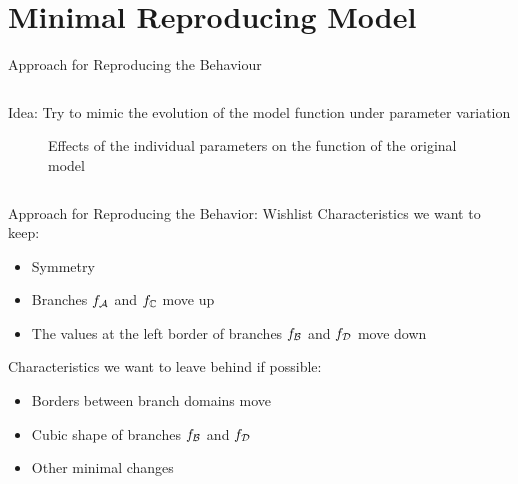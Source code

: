 
\section{Minimal Reproducing Model}

\begin{frame}{Approach for Reproducing the Behaviour}
    \vspace{-1em}
    \begin{columns}
        \begin{column}{1 \textwidth}
            Idea:
            Try to mimic the evolution of the model function under parameter variation

            \vspace{-2.0em}
            \begin{figure}
                \centering
                \caption*{Effects of the individual parameters on the function of the original model}
            \end{figure}
        \end{column}
    \end{columns}
\end{frame}

\begin{frame}{Approach for Reproducing the Behavior: Wishlist}
    Characteristics we want to keep:
    \begin{itemize}
        \item Symmetry
        \item Branches $f_{\mathcal{A}}$ and $f_{\mathbb{C}}$ move up
        \item The values at the left border of branches $f_{\mathcal{B}}$ and $f_{\mathcal{D}}$ move down
    \end{itemize}

    \vspace{2em}
    Characteristics we want to leave behind if possible:
    \begin{itemize}
        \item Borders between branch domains move
        \item Cubic shape of branches $f_{\mathcal{B}}$ and $f_{\mathcal{D}}$
        \item Other minimal changes
    \end{itemize}
\end{frame}

